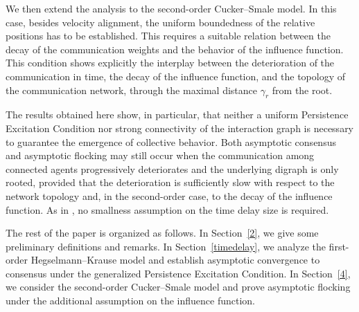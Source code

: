 \documentclass[11pt]{article}
\begin{document}
We then extend the analysis to the second-order Cucker--Smale model. In this
case, besides velocity alignment, the uniform boundedness of the relative
positions has to be established. This requires a suitable relation between the
decay of the communication weights and the behavior of the influence function.
	This condition shows explicitly the interplay between the deterioration of the
	communication in time, the decay of the influence
	function,  and the topology of the communication network,
	through the maximal distance $\gamma_r$ from the root.
	
	The results obtained here show, in particular, that neither a uniform
	Persistence Excitation Condition nor strong connectivity of the interaction
	graph is necessary to guarantee the emergence of collective behavior. Both
	asymptotic consensus and asymptotic flocking may still occur when the
	communication among connected agents progressively deteriorates and the
	underlying digraph is only rooted, provided that the deterioration is
	sufficiently slow with respect to the network topology and, in the
	second-order case, to the decay of the influence function. As in
	\cite{CCP}, no smallness assumption on the time delay
	size is required.
	
	The rest of the paper is organized as follows. In Section~\ref{2}, we give some preliminary definitions and remarks. In Section~\ref{timedelay}, we analyze the
	first-order Hegselmann--Krause model and establish asymptotic convergence to
	consensus under the generalized Persistence Excitation Condition. In
	Section~\ref{4}, we consider the second-order Cucker--Smale model and
	prove asymptotic flocking under the additional assumption on the influence function.
\end{document}
